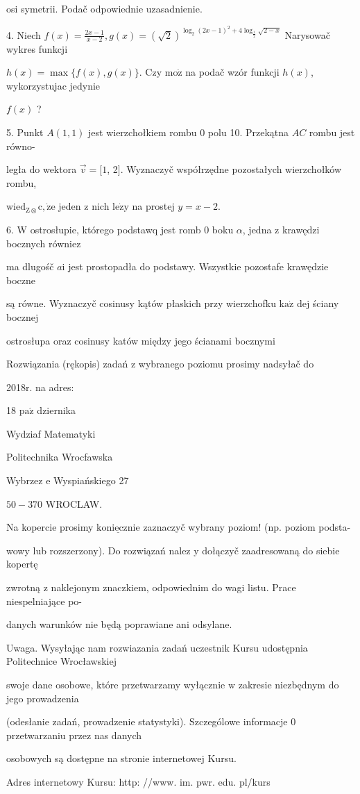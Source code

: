 \documentclass[a4paper,12pt]{article}
\begin{document}
osi symetrii. Podač odpowiednie uzasadnienie.

4. Niech $f(x) = \displaystyle \frac{2x-1}{x-2}, g(x) = (\sqrt{2})^{\log_{2}(2x-1)^{2}+4\log_{\frac{1}{2}}\sqrt{2-x}}$ Narysowač wykres funkcji

$h(x) = \displaystyle \max\{f(x),g(x)\}$. Czy $\mathrm{m}\mathrm{o}\dot{\mathrm{z}}$ na podač wzór funkcji $h(x)$, wykorzystujac jedynie

$f(x)$ ?

5. Punkt $A(1,1)$ jest wierzchołkiem rombu $0$ polu 10. Przekątna $AC$ rombu jest równo-

legła do wektora $\vec{v}=[1$, 2$]$. Wyznaczyč współrzędne pozostałych wierzchołków rombu,

$\mathrm{w}\mathrm{i}\mathrm{e}\mathrm{d}_{\mathrm{Z}\otimes}\mathrm{c}, \dot{\mathrm{z}}\mathrm{e}$ jeden $\mathrm{z}$ nich $\mathrm{l}\mathrm{e}\dot{\mathrm{z}}\mathrm{y}$ na prostej $y=x-2.$

6. $\mathrm{W}$ ostrosłupie, którego podstawq jest romb $0$ boku $\alpha$, jedna $\mathrm{z}$ krawędzi bocznych równiez

ma dlugośč $a\mathrm{i}$ jest prostopadła do podstawy. Wszystkie pozostafe krawędzie boczne

są równe. Wyznaczyč cosinusy kątów płaskich przy wierzchofku $\mathrm{k}\mathrm{a}\dot{\mathrm{z}}$ dej ściany bocznej

ostrosłupa oraz cosinusy katów między jego ścianami bocznymi

Rozwiązania (rękopis) zadań z wybranego poziomu prosimy nadsyłač do

2018r. na adres:

18 $\mathrm{p}\mathrm{a}\acute{\mathrm{z}}$ dziernika

Wydziaf Matematyki

Politechnika Wrocfawska

Wybrzez $\mathrm{e}$ Wyspiańskiego 27

$50-370$ WROCLAW.

Na kopercie prosimy $\underline{\mathrm{k}\mathrm{o}\mathrm{n}\mathrm{i}\mathrm{e}\mathrm{c}\mathrm{z}\mathrm{n}\mathrm{i}\mathrm{e}}$ zaznaczyč wybrany poziom! (np. poziom podsta-

wowy lub rozszerzony). Do rozwiązań nalez $\mathrm{y}$ dołączyč zaadresowaną do siebie kopertę

zwrotną $\mathrm{z}$ naklejonym znaczkiem, odpowiednim do wagi listu. Prace niespelniające po-

danych warunków nie będą poprawiane ani odsylane.

Uwaga. Wysyłając nam rozwiazania zadań uczestnik Kursu udostępnia Politechnice Wrocławskiej

swoje dane osobowe, które przetwarzamy wyłącznie $\mathrm{w}$ zakresie niezbędnym do jego prowadzenia

(odesłanie zadań, prowadzenie statystyki). Szczególowe informacje $0$ przetwarzaniu przez nas danych

osobowych są dostępne na stronie internetowej Kursu.

Adres internetowy Kursu: http: //www. im. pwr. edu. pl/kurs
\end{document}
